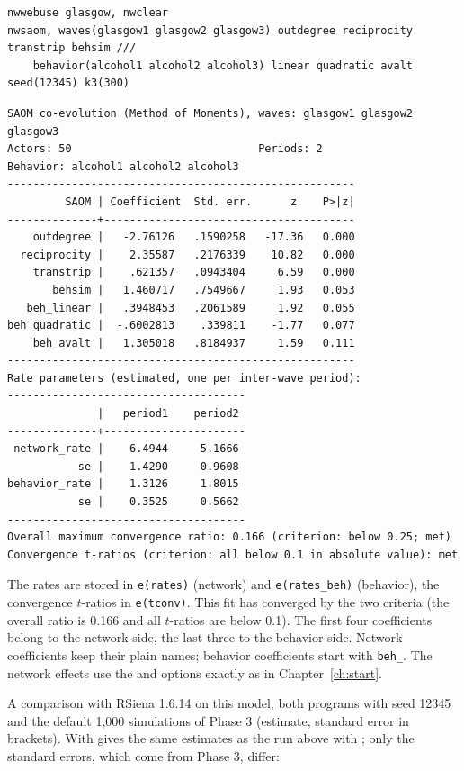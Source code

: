 \begin{lstlisting}
nwwebuse glasgow, nwclear
nwsaom, waves(glasgow1 glasgow2 glasgow3) outdegree reciprocity transtrip behsim ///
    behavior(alcohol1 alcohol2 alcohol3) linear quadratic avalt seed(12345) k3(300)
\end{lstlisting}
\begin{lstlisting}
SAOM co-evolution (Method of Moments), waves: glasgow1 glasgow2 glasgow3
Actors: 50                             Periods: 2
Behavior: alcohol1 alcohol2 alcohol3
------------------------------------------------------
         SAOM | Coefficient  Std. err.      z    P>|z|
--------------+---------------------------------------
    outdegree |   -2.76126   .1590258   -17.36   0.000
  reciprocity |    2.35587   .2176339    10.82   0.000
    transtrip |    .621357   .0943404     6.59   0.000
       behsim |   1.460717   .7549667     1.93   0.053
   beh_linear |   .3948453   .2061589     1.92   0.055
beh_quadratic |  -.6002813    .339811    -1.77   0.077
    beh_avalt |   1.305018   .8184937     1.59   0.111
------------------------------------------------------
Rate parameters (estimated, one per inter-wave period):
-------------------------------------
              |   period1    period2
--------------+----------------------
 network_rate |    6.4944     5.1666
           se |    1.4290     0.9608
behavior_rate |    1.3126     1.8015
           se |    0.3525     0.5662
-------------------------------------
Overall maximum convergence ratio: 0.166 (criterion: below 0.25; met)
Convergence t-ratios (criterion: all below 0.1 in absolute value): met
\end{lstlisting}
The rates are stored in \texttt{e(rates)} (network) and \texttt{e(rates\_beh)} (behavior), the convergence $t$-ratios in \texttt{e(tconv)}. This fit has converged by the two criteria (the overall ratio is 0.166 and all $t$-ratios are below 0.1). The first four coefficients belong to the network side, the last three to the behavior side. Network coefficients keep their plain names; behavior coefficients start with \texttt{beh\_}. The network effects use the  and  options exactly as in Chapter~\ref{ch:start}.

A comparison with RSiena 1.6.14 on this model, both programs with seed 12345 and the default 1,000 simulations of Phase 3 (estimate, standard error in brackets). With  \nwsaom{} gives the same estimates as the run above with ; only the standard errors, which come from Phase 3, differ:

